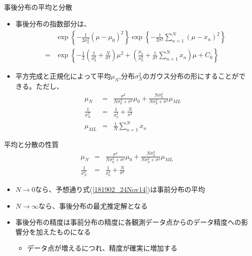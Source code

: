 \begin{frame}{事後分布の平均と分散}
 \begin{itemize}
  \item 事後分布の指数部分は、
        \begin{eqnarray}
         & &\exp\left\{-\frac{1}{2\sigma_0^2}(\mu-\mu_0)^2\right\} \exp\left\{-\frac{1}{2\sigma^2}\sum_{n=1}^{N}(\mu-x_n)^2\right\} \nonumber \\
         &= & \exp\left\{-\frac{1}{2}\left(\frac{1}{\sigma_0^2}+\frac{N}{\sigma^2}\right)\mu^2 +\left(\frac{\mu_0}{\sigma_0^2}+\frac{1}{\sigma^2}\sum_{n=1}^{N}x_n\right)\mu +C_0 \right\} \nonumber
        \end{eqnarray}
  \item 平方完成と正規化によって平均$\mu_N$,分布$\sigma_N^2$のガウス分布の形にすることができる。ただし、
        \begin{eqnarray}
         \mu_N& = & \frac{\sigma^2}{N\sigma_0^2+\sigma^2}\mu_0 + \frac{N\sigma_0^2}{N\sigma_0^2+\sigma^2}\mu_{ML}\label{223654_18Nov14}\\
         \frac{1}{\sigma_N^2}&= & \frac{1}{\sigma_0^2} + \frac{N}{\sigma^2}\label{181817_24Nov14}\\
         \mu_{ML}&= & \frac{1}{N}\sum_{n=1}^{N}x_n
        \end{eqnarray}
 \end{itemize}
\end{frame}

\begin{frame}{平均と分散の性質}
 \begin{eqnarray}
  \mu_N& = & \frac{\sigma^2}{N\sigma_0^2+\sigma^2}\mu_0 + \frac{N\sigma_0^2}{N\sigma_0^2+\sigma^2}\mu_{ML}\label{181902_24Nov14}\\
  \frac{1}{\sigma_N^2}&= & \frac{1}{\sigma_0^2} + \frac{N}{\sigma^2}
 \end{eqnarray}
 \begin{itemize}
  \item $N\rightarrow0$なら、予想通り式(\ref{181902_24Nov14})は事前分布の平均
  \item $N\rightarrow\infty$なら、事後分布の最尤推定解となる
  \item 事後分布の精度は事前分布の精度に各観測データ点からのデータ精度への影響分を加えたものになる
        \begin{itemize}
         \item データ点が増えるにつれ、精度が確実に増加する
        \end{itemize}
 \end{itemize}
\end{frame}

